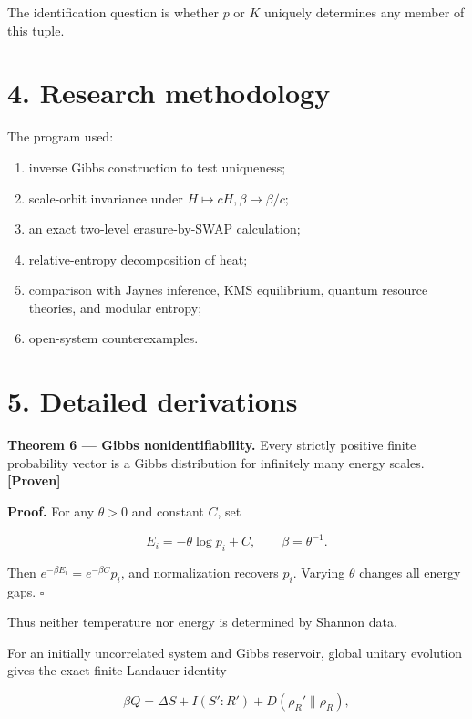 \documentclass[11pt,a4paper,openany]{report}
\newcommand{\statusProven}{\textcolor{fingreen}{[Proven]}}
\begin{document}
The identification question is whether \(p\) or \(K\) uniquely determines any member of this tuple.

\section{4. Research methodology}

The program used:

\begin{enumerate}
\item 
inverse Gibbs construction to test uniqueness;

\item 
scale-orbit invariance under \(H\mapsto cH,\beta\mapsto\beta/c\);

\item 
an exact two-level erasure-by-SWAP calculation;

\item 
relative-entropy decomposition of heat;

\item 
comparison with Jaynes inference, KMS equilibrium, quantum resource theories, and modular entropy;

\item 
open-system counterexamples.

\end{enumerate}

\section{5. Detailed derivations}

\textbf{Theorem 6 — Gibbs nonidentifiability.} Every strictly positive finite probability vector is a Gibbs distribution for infinitely many energy scales. \textbf{\statusProven{}}

\textbf{Proof.} For any \(\theta>0\) and constant \(C\), set

\[
E_i=-\theta\log p_i+C,\qquad \beta=\theta^{-1}.
\]

Then \(e^{-\beta E_i}=e^{-\beta C}p_i\), and normalization recovers \(p_i\). Varying \(\theta\) changes all energy gaps. \(\square\)

Thus neither temperature nor energy is determined by Shannon data.

For an initially uncorrelated system and Gibbs reservoir, global unitary evolution gives the exact finite Landauer identity

\[
\beta Q
=\Delta S
+I(S':R')
+D(\rho_R'\|\rho_R),
\]
\end{document}
